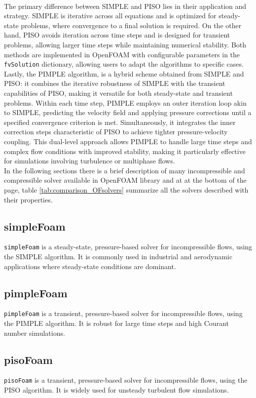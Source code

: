 \documentclass[a5paper]{sapthesis}
\begin{document}
	\\
	The primary difference between SIMPLE and PISO lies in their application and strategy. SIMPLE is iterative across all equations and is optimized for steady-state problems, where convergence to a final solution is required. On the other hand, PISO avoids iteration across time steps and is designed for transient problems, allowing larger time steps while maintaining numerical stability. Both methods are implemented in OpenFOAM with configurable parameters in the \texttt{fvSolution} dictionary, allowing users to adapt the algorithms to specific cases.
	\\
	Lastly, the PIMPLE algorithm, is a hybrid scheme obtained from SIMPLE and PISO: it combines the iterative robustness of SIMPLE with the transient capabilities of PISO, making it versatile for both steady-state and transient problems. Within each time step, PIMPLE employs an outer iteration loop akin to SIMPLE, predicting the velocity field and applying pressure corrections until a specified convergence criterion is met. Simultaneously, it integrates the inner correction steps characteristic of PISO to achieve tighter pressure-velocity coupling. This dual-level approach allows PIMPLE to handle large time steps and complex flow conditions with improved stability, making it particularly effective for simulations involving turbulence or multiphase flows.
	\\
	In the following sections there is a brief description of many incompressible and compressible solver available in OpenFOAM library and at at the bottom of the page, table \ref{tab:comparison_OFsolvers} summarize all the solvers described with their properties.
	\subsection*{simpleFoam}
	\texttt{simpleFoam} is a steady-state, pressure-based solver for incompressible flows, using the SIMPLE algorithm. It is commonly used in industrial and aerodynamic applications where steady-state conditions are dominant.
	
	\subsection*{pimpleFoam}
	\texttt{pimpleFoam} is a transient, pressure-based solver for incompressible flows, using the PIMPLE algorithm. It is robust for large time steps and high Courant number simulations.
	
	\subsection*{pisoFoam}
	\texttt{pisoFoam} is a transient, pressure-based solver for incompressible flows, using the PISO algorithm. It is widely used for unsteady turbulent flow simulations.
	
\end{document}
